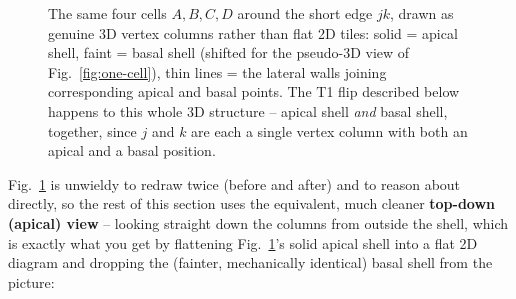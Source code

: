 \documentclass[11pt,a4paper]{report}
\begin{document}
\begin{figure}[h]
\caption{The same four cells $A,B,C,D$ around the short edge $jk$,
drawn as genuine 3D vertex columns rather than flat 2D tiles: solid
= apical shell, faint = basal shell (shifted for the pseudo-3D view of
Fig.~\ref{fig:one-cell}), thin lines = the lateral walls joining
corresponding apical and basal points. The T1 flip described below
happens to this whole 3D structure -- apical shell \emph{and} basal
shell, together, since $j$ and $k$ are each a single vertex column with
both an apical and a basal position.}
\label{fig:T1-3d}
\end{figure}

Fig.~\ref{fig:T1-3d} is unwieldy to redraw twice (before and after) and
to reason about directly, so the rest of this section uses the
equivalent, much cleaner \textbf{top-down (apical) view} -- looking
straight down the columns from outside the shell, which is exactly
what you get by flattening Fig.~\ref{fig:T1-3d}'s solid apical shell
into a flat 2D diagram and dropping the (fainter, mechanically
identical) basal shell from the picture:
\end{document}
